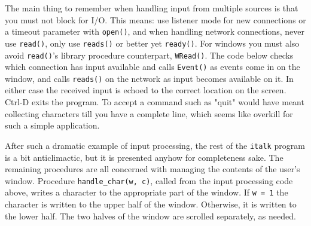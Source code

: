 The main thing to remember when handling input from multiple
sources is that you must not block for I/O. This means: use listener
mode for new connections or a timeout parameter with \texttt{open()},
and when handling network connections, never use \texttt{read()},
only use \texttt{reads()} or better yet \texttt{ready()}.
For windows you must also avoid
\texttt{read()}'s library procedure counterpart,
\texttt{WRead()}. The code below checks which connection has input
available and calls \texttt{Event()} as events come in on the window,
and calls \texttt{reads()} on the network as input becomes available on
it. In either case the received input is echoed to the correct location
on the screen. Ctrl-D exits the program. To accept a command such as
"quit" would have meant collecting
characters till you have a complete line, which seems like overkill for
such a simple application.


After such a dramatic example of input processing, the rest of the
\texttt{italk} program is a bit anticlimactic, but it is presented
anyhow for completeness sake. The remaining procedures are all
concerned with managing the contents of the user's
window. Procedure \texttt{handle\_char(w, c)}, called from the input
processing code above, writes a character to the appropriate part of
the window. If \texttt{w = 1} the character is written to the upper
half of the window. Otherwise, it is written to the lower half. The two
halves of the window are scrolled separately, as needed.

